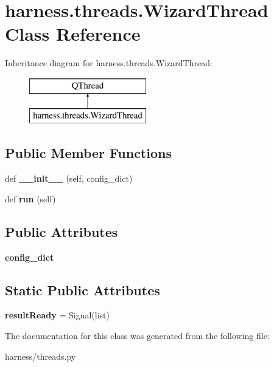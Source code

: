 \hypertarget{classharness_1_1threads_1_1_wizard_thread}{}\section{harness.\+threads.\+Wizard\+Thread Class Reference}
\label{classharness_1_1threads_1_1_wizard_thread}
Inheritance diagram for harness.\+threads.\+Wizard\+Thread\+:\begin{figure}[H]
\begin{center}
\leavevmode
\includegraphics[height=2.000000cm]{d2/dfb/classharness_1_1threads_1_1_wizard_thread}
\end{center}
\end{figure}
\subsection*{Public Member Functions}
\begin{DoxyCompactItemize}
\item 
\mbox{\label{classharness_1_1threads_1_1_wizard_thread_a4539d012a2b4021a1a6c317bacf2f8c8}} 
def {\bfseries \+\_\+\+\_\+init\+\_\+\+\_\+} (self, config\+\_\+dict)
\item 
\mbox{\label{classharness_1_1threads_1_1_wizard_thread_af7affcd29a88b24499a6791720bb00ba}} 
def {\bfseries run} (self)
\end{DoxyCompactItemize}
\subsection*{Public Attributes}
\begin{DoxyCompactItemize}
\item 
\mbox{\label{classharness_1_1threads_1_1_wizard_thread_a5fa174d50b35e9604dedf7d51611cfe7}} 
{\bfseries config\+\_\+dict}
\end{DoxyCompactItemize}
\subsection*{Static Public Attributes}
\begin{DoxyCompactItemize}
\item 
\mbox{\label{classharness_1_1threads_1_1_wizard_thread_a8e8ffede02439423a37e30165f01ca35}} 
{\bfseries result\+Ready} = Signal(list)
\end{DoxyCompactItemize}


The documentation for this class was generated from the following file\+:\begin{DoxyCompactItemize}
\item 
harness/threads.\+py\end{DoxyCompactItemize}
